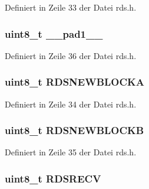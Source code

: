 Definiert in Zeile 33 der Datei rds.\+h.

\hypertarget{structinfo_a77f12d2e278bd5c07712648ac0df5e08}{}
\subsubsection[{\+\_\+\+\_\+pad1\+\_\+\+\_\+}]{\setlength{\rightskip}{0pt plus 5cm}uint8\+\_\+t \+\_\+\+\_\+pad1\+\_\+\+\_\+}\label{structinfo_a77f12d2e278bd5c07712648ac0df5e08}


Definiert in Zeile 36 der Datei rds.\+h.

\hypertarget{structinfo_a62260ece65dc68c2467e5e1b09e5f144}{}
\subsubsection[{R\+D\+S\+N\+E\+W\+B\+L\+O\+C\+K\+A}]{\setlength{\rightskip}{0pt plus 5cm}uint8\+\_\+t R\+D\+S\+N\+E\+W\+B\+L\+O\+C\+K\+A}\label{structinfo_a62260ece65dc68c2467e5e1b09e5f144}


Definiert in Zeile 34 der Datei rds.\+h.

\hypertarget{structinfo_acd71c83a87b1a99a4784dad5f2a9477f}{}
\subsubsection[{R\+D\+S\+N\+E\+W\+B\+L\+O\+C\+K\+B}]{\setlength{\rightskip}{0pt plus 5cm}uint8\+\_\+t R\+D\+S\+N\+E\+W\+B\+L\+O\+C\+K\+B}\label{structinfo_acd71c83a87b1a99a4784dad5f2a9477f}


Definiert in Zeile 35 der Datei rds.\+h.

\hypertarget{structinfo_a56e25cd5c95053ebd95c3c35654680d6}{}
\subsubsection[{R\+D\+S\+R\+E\+C\+V}]{\setlength{\rightskip}{0pt plus 5cm}uint8\+\_\+t R\+D\+S\+R\+E\+C\+V}\label{structinfo_a56e25cd5c95053ebd95c3c35654680d6}


